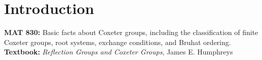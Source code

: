 
\section{Introduction}

\noindent \textbf{MAT 830:} Basic facts about Coxeter groups, including the classification of finite Coxeter groups, root systems, exchange conditions, and Bruhat ordering. \\

\noindent \textbf{Textbook:} \emph{Reflection Groups and Coxeter Groups}, James E. Humphreys
















































